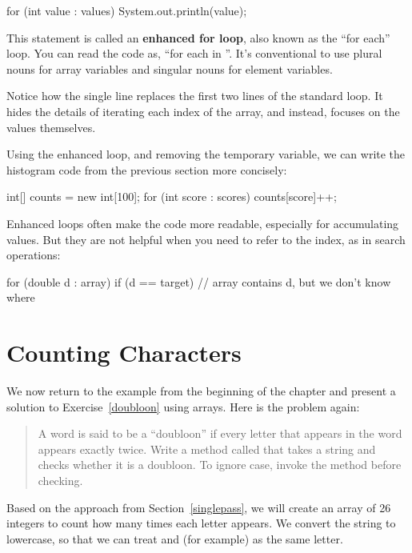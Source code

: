 \begin{code}
for (int value : values) {
    System.out.println(value);
}
\end{code}


This statement is called an {\bf enhanced for loop}, also known as the ``for each'' loop.
You can read the code as, ``for each  in ''.
It's conventional to use plural nouns for array variables and singular nouns for element variables.

Notice how the single line  replaces the first two lines of the standard  loop.
It hides the details of iterating each index of the array, and instead, focuses on the values themselves.

Using the enhanced  loop, and removing the temporary variable, we can write the histogram code from the previous section more concisely:

\begin{code}
int[] counts = new int[100];
for (int score : scores) {
    counts[score]++;
}
\end{code}

Enhanced  loops often make the code more readable, especially for accumulating values.
But they are not helpful when you need to refer to the index, as in search operations:

\begin{code}
for (double d : array) {
    if (d == target) {
        // array contains d, but we don't know where
    }
}
\end{code}


\section{Counting Characters}

We now return to the example from the beginning of the chapter and present a solution to Exercise~\ref{doubloon} using arrays.
Here is the problem again:

\begin{quote}
A word is said to be a ``doubloon'' if every letter that appears in the word appears exactly twice.
Write a method called  that takes a string and checks whether it is a doubloon.
To ignore case, invoke the  method before checking.
\end{quote}

Based on the approach from Section~\ref{singlepass}, we will create an array of 26 integers to count how many times each letter appears.
We convert the string to lowercase, so that we can treat  and  (for example) as the same letter.

